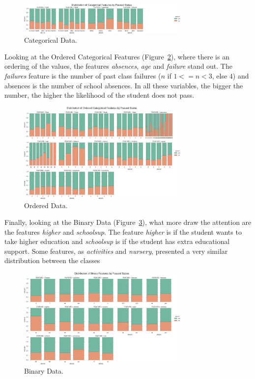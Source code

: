 \documentclass[a4paper]{article}
\begin{document}
\begin{figure}[ht]
\centering
\includegraphics[width=0.75\textwidth]{figures/categorical.png}
\caption{\label{fig:categorical}Categorical Data.}
\end{figure}

Looking at the Ordered Categorical Features (Figure~\ref{fig:ordCategorical}), where there is an ordering of the values, the features \textit{absences}, \textit{age} and \textit{failure} stand out. The \textit{failures} feature is the number of past class failures ($n$ if $1<=n<3$, else $4$) and absences is the number of school absences. In all these variables, the bigger the number, the higher the likelihood of the student does not pass.

\begin{figure}[ht]
\centering
\includegraphics[width=0.75\textwidth]{figures/ordCategorical.png}
\caption{\label{fig:ordCategorical}Ordered Data.}
\end{figure}

Finally, looking at the Binary Data (Figure~\ref{fig:binary}), what more draw the attention are the features \textit{higher} and \textit{schoolsup}. The feature \textit{higher} is if the student wants to take higher education and \textit{schoolsup} is if the student has extra educational support. Some features, as \textit{activities} and \textit{nursery}, presented a very similar distribution between the classes

\begin{figure}[ht]
\centering
\includegraphics[width=0.75\textwidth]{figures/binary.png}
\caption{\label{fig:binary}Binary Data.}
\end{figure}
\end{document}
